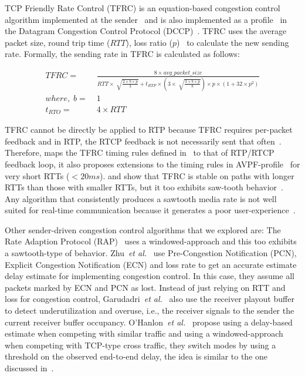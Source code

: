 TCP Friendly Rate Control (TFRC) is an equation-based congestion control
algorithm implemented at the sender~\cite{tfrc_347397} and is also implemented
as a profile~\cite{rfc4342} in the Datagram Congestion Control Protocol
(DCCP)~\cite{rfc4340}. TFRC uses the average packet size, round trip time
($RTT$), loss ratio ($p$)~\cite{rfc3448} to calculate the new sending rate.
Formally, the sending rate in TFRC is calculated as follows:

\begin{align*}
 TFRC = &\; \frac{8 \times avg\_packet\_size}
{RTT \times \sqrt[]{\frac{2 \times b \times p}{3}} + t_{RTP} \times 
\left( 3 \times \sqrt[]{\frac{3 \times b \times p}{8}}\right) \times p \times
\left( 1+32 \times p^2 \right)}\\
where,\; b = &\; 1\\
t_{RTO} = &\; 4 \times RTT
\end{align*}

TFRC cannot be directly be applied to RTP because TFRC requires per-packet
feedback and in RTP, the RTCP feedback is not necessarily sent that
often~\cite{draft.rmcat.feedback}. Therefore, \cite{draft.rtp.tfrc} maps the
TFRC timing rules defined in~\cite{rfc4828, rfc5348} to that of RTP/RTCP
feedback loop, it also proposes extensions to the timing rules in
AVPF-profile~\cite{rfc4585} for very short RTTs ($<20ms$).
\cite{Gharai06:ICME} and \cite{VladBalan:2007dq} show that TFRC is stable on
paths with longer RTTs than those with smaller RTTs, but it too exhibits
saw-tooth behavior~\cite{saurin:2006:thesis}. Any algorithm that consistently
produces a sawtooth media rate is not well suited for real-time communication
because it generates a poor user-experience~\cite{Gharai:2002wt,
Zink03subjectiveimpression}.

Other sender-driven congestion control algorithms that we explored are: The
Rate Adaption Protocol (RAP)~\cite{rap:752152} uses a windowed-approach and
this too exhibits a sawtooth-type of behavior. Zhu~\textit{et
al.}~\cite{rmcat-nada} use Pre-Congestion Notification (PCN), Explicit
Congestion Notification (ECN) and loss rate to get an accurate estimate delay
estimate for implementing congestion control. In this case, they assume all
packets marked by ECN and PCN as lost. Instead of just relying on RTT and loss
for congestion control, Garudadri~\textit{et al.}~\cite{4397059} also use the
receiver playout buffer to detect underutilization and overuse, i.e., the
receiver signals to the sender the current receiver buffer occupancy.
O'Hanlon~\textit{et al.}~\cite{rmcat-dflow} propose using a delay-based
estimate when competing with similar traffic and using a windowed-approach
when competing with TCP-type cross traffic, they switch modes by using a
threshold on the observed end-to-end delay, the idea is similar to the one
discussed in~\cite{budzisz2011fair}.




